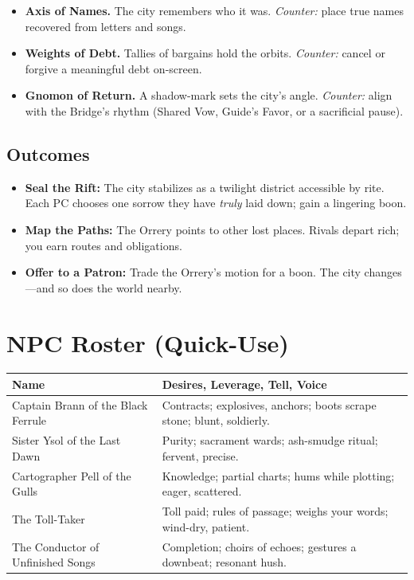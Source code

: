 \documentclass[11pt]{article}
\begin{document}
\begin{itemize}
\item \textbf{Axis of Names.} The city remembers who it was. \emph{Counter:} place true names recovered from letters and songs.
\item \textbf{Weights of Debt.} Tallies of bargains hold the orbits. \emph{Counter:} cancel or forgive a meaningful debt on-screen.
\item \textbf{Gnomon of Return.} A shadow-mark sets the city's angle. \emph{Counter:} align with the Bridge's rhythm (Shared Vow, Guide's Favor, or a sacrificial pause).
\end{itemize}

\subsection*{Outcomes}
\begin{itemize}
\item \textbf{Seal the Rift:} The city stabilizes as a twilight district accessible by rite. Each PC chooses one sorrow they have \emph{truly} laid down; gain a lingering boon.
\item \textbf{Map the Paths:} The Orrery points to other lost places. Rivals depart rich; you earn routes and obligations.
\item \textbf{Offer to a Patron:} Trade the Orrery's motion for a boon. The city changes---and so does the world nearby.
\end{itemize}

\section*{NPC Roster (Quick-Use)}
\begin{tabularx}{\linewidth}{@{}l X@{}}
\toprule
\textbf{Name} & \textbf{Desires, Leverage, Tell, Voice}\\
\midrule
Captain Brann of the Black Ferrule & Contracts; explosives, anchors; boots scrape stone; blunt, soldierly.\\
Sister Ysol of the Last Dawn & Purity; sacrament wards; ash-smudge ritual; fervent, precise.\\
Cartographer Pell of the Gulls & Knowledge; partial charts; hums while plotting; eager, scattered.\\
The Toll-Taker & Toll paid; rules of passage; weighs your words; wind-dry, patient.\\
The Conductor of Unfinished Songs & Completion; choirs of echoes; gestures a downbeat; resonant hush.\\
\bottomrule
\end{tabularx}
\end{document}
